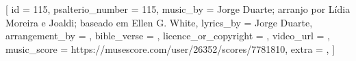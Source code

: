 
[
    id                     = {115},
    psalterio_number       = {115},
    music_by               = {Jorge Duarte; arranjo por Lídia Moreira e Joaldi; baseado em Ellen G. White},
    lyrics_by              = {Jorge Duarte},
    arrangement_by         = {},
    bible_verse            = {},
    licence_or_copyright   = {},
    video_url              = {},
    music_score            = {https://musescore.com/user/26352/scores/7781810},
    extra                  = {},
]


\beginverse


